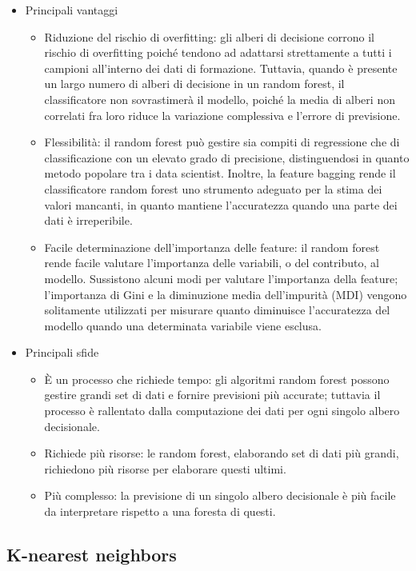 \begin{itemize}
  \item Principali vantaggi
  \begin{itemize}
    \item Riduzione del rischio di overfitting: gli alberi di decisione corrono il rischio di overfitting poiché tendono ad adattarsi strettamente a tutti i campioni all'interno dei dati di formazione. 
    Tuttavia, quando è presente un largo numero di alberi di decisione in un random forest, il classificatore non sovrastimerà il modello, poiché la media di alberi non correlati fra loro riduce la variazione complessiva e l'errore di previsione.
    \item Flessibilità: il random forest può gestire sia compiti di regressione che di classificazione con un elevato grado di precisione, distinguendosi in quanto metodo popolare tra i data scientist. 
    Inoltre, la feature bagging rende il classificatore random forest uno strumento adeguato per la stima dei valori mancanti, in quanto mantiene l'accuratezza quando una parte dei dati è irreperibile.
    \item Facile determinazione dell'importanza delle feature: il random forest rende facile valutare l'importanza delle variabili, o del contributo, al modello. 
    Sussistono alcuni modi per valutare l'importanza della feature; l’importanza di Gini e la diminuzione media dell'impurità (MDI) vengono solitamente utilizzati per misurare quanto diminuisce l'accuratezza del modello quando una determinata variabile viene esclusa.
  \end{itemize}
  \item Principali sfide
  \begin{itemize}
    \item È un processo che richiede tempo: gli algoritmi random forest possono gestire grandi set di dati e fornire previsioni più accurate; tuttavia il processo è rallentato dalla computazione dei dati per ogni singolo albero decisionale.
    \item Richiede più risorse: le random forest, elaborando set di dati più grandi, richiedono più risorse per elaborare questi ultimi.
    \item Più complesso: la previsione di un singolo albero decisionale è più facile da interpretare rispetto a una foresta di questi.
  \end{itemize}
\end{itemize}


\subsection{K-nearest neighbors}
\cite{KNNibm}

